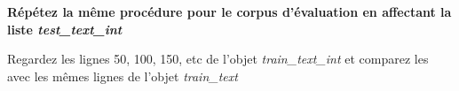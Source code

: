 


\textbf{
Répétez la même procédure pour le corpus d'évaluation en affectant la liste \textit{test\_text\_int}}

Regardez les lignes 50, 100, 150, etc de l'objet \textit{train\_text\_int} et comparez les avec les mêmes lignes de l'objet \textit{train\_text}